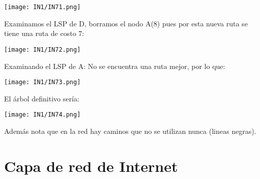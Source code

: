 \documentclass[
	12pt, %
	fleqn, %
	a4paper, %
	oneside, %
]{LegrandOrangeBook}
\begin{document}
\begin{example}
\begin{center}
\texttt{[image: IN1/IN71.png]}
\end{center}
\item Examinamos el LSP de D, borramos el nodo A(8) pues por esta nueva ruta se tiene una ruta de costo 7:
\begin{center}
\texttt{[image: IN1/IN72.png]}
\end{center}
\item Examinando el LSP de A: No se encuentra una ruta mejor, por lo que:
\begin{center}
\texttt{[image: IN1/IN73.png]}
\end{center}
El árbol definitivo sería:
\begin{center}
\texttt{[image: IN1/IN74.png]}
\end{center}
Además nota que en la red hay caminos que no se utilizan nunca (lineas negras).
\end{example}
\section{Capa de red de Internet}
\end{document}
